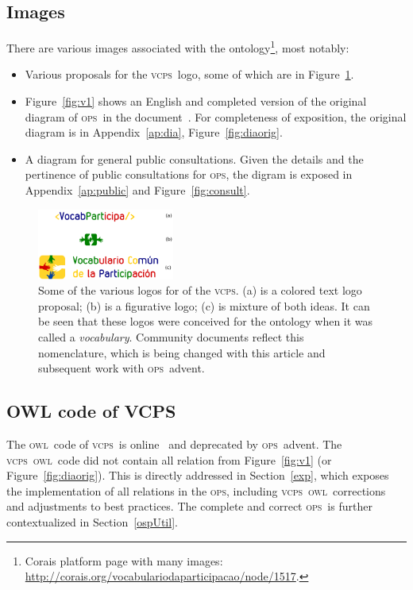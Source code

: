 \documentclass[10pt,letterpaper]{article}
\newcommand{\ops}{\textsc{ops}}
\newcommand{\vcps}{\textsc{vcps}}
\newcommand{\owl}{\textsc{owl}}
\begin{document}
\subsection{Images}\label{sec:im}
There are various images associated with the ontology\footnote{Corais platform page with many images: \url{http://corais.org/vocabulariodaparticipacao/node/1517}.}, most notably:

\begin{itemize}
    \item Various proposals for the \vcps\ logo, some of which are in Figure~\ref{logo}.
    \item Figure~\ref{fig:v1} shows an English and completed version of the original diagram of \ops\ in the document~\cite{conceptualMod}. For completeness of exposition, the original diagram is in Appendix~\ref{ap:dia}, Figure~\ref{fig:diaorig}.
    \item A diagram for general public consultations. Given the details and the pertinence of public consultations for \ops, the digram is exposed in Appendix~\ref{ap:public} and Figure~\ref{fig:consult}.
\end{itemize}

\begin{figure}[!h]
    \centering
    \includegraphics[width=0.4\textwidth]{figs/logoUnificadoDoPDF}
    \caption{Some of the various logos for of the \vcps. (a) is a colored text logo proposal; (b) is a figurative logo; (c) is mixture of both ideas. It can be seen that these logos were conceived for the ontology when it was called a \emph{vocabulary}. Community documents reflect this nomenclature, which is being changed with this article and subsequent work with \ops\ advent.}
    \label{logo}
\end{figure}

\subsection{OWL code of VCPS}\label{owl}

The \owl\ code of \vcps\ is online~\cite{owlVcps} and deprecated by \ops\ advent. 
The \vcps\ \owl\ code did not contain all relation from Figure~\ref{fig:v1} (or Figure~\ref{fig:diaorig}). This is directly addressed in Section~\ref{exp}, which exposes the implementation of all relations in the \ops, including \vcps\ \owl\ corrections and adjustments to best practices. The complete and correct \ops\ is further contextualized in Section~\ref{ospUtil}.
\end{document}
